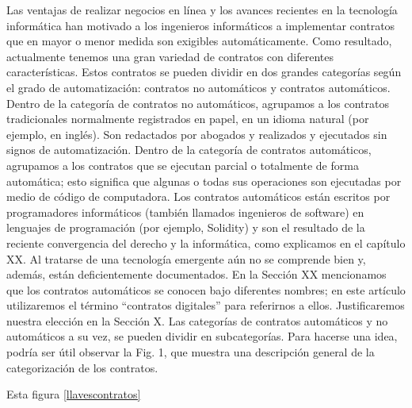 \documentclass[12pt]{report} %
\begin{document}
\begin{itemize}
Las ventajas de realizar negocios en línea y los avances recientes en la tecnología informática han motivado a los ingenieros informáticos a implementar contratos que en mayor o menor medida son exigibles automáticamente. Como resultado, actualmente tenemos una gran variedad de contratos con diferentes características. Estos contratos se pueden dividir en dos grandes categorías según el grado de automatización: contratos no automáticos y contratos automáticos. Dentro de la categoría de contratos no automáticos, agrupamos a los contratos tradicionales normalmente registrados en papel, en un idioma natural (por ejemplo, en inglés). Son redactados por abogados y realizados y ejecutados sin signos de automatización. Dentro de la categoría de contratos automáticos, agrupamos a los contratos que se ejecutan parcial o totalmente de forma automática; esto significa que algunas o todas sus operaciones son ejecutadas por medio de código de computadora. Los contratos automáticos están escritos por programadores informáticos (también llamados ingenieros de software) en lenguajes de programación (por ejemplo, Solidity) y son el resultado de la reciente convergencia del derecho y la informática, como explicamos en el capítulo XX. Al tratarse de una tecnología emergente aún no se comprende bien y, además, están deficientemente documentados. En la Sección XX mencionamos que los contratos automáticos se conocen bajo diferentes nombres; en este artículo utilizaremos el término “contratos digitales” para referirnos a ellos. Justificaremos nuestra elección en la Sección  X. Las categorías de contratos automáticos y no automáticos a su vez, se pueden dividir en subcategorías. Para hacerse una idea, podría ser útil observar la Fig. 1, que muestra una descripción general de la categorización de los contratos.



Esta figura \ref{llavescontratos}


\end{itemize}
\end{document}
